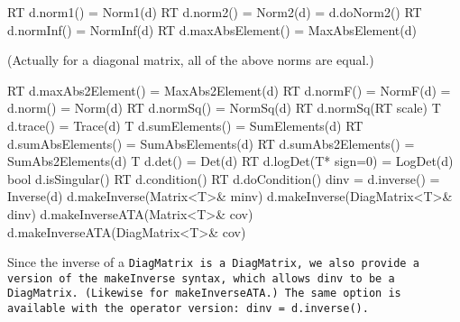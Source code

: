 \begin{tmvcode}
RT d.norm1() = Norm1(d)
RT d.norm2() = Norm2(d) = d.doNorm2()
RT d.normInf() = NormInf(d)
RT d.maxAbsElement() = MaxAbsElement(d)
\end{tmvcode}
(Actually for a diagonal matrix, all of the above norms are equal.)
\begin{tmvcode}
RT d.maxAbs2Element() = MaxAbs2Element(d)
RT d.normF() = NormF(d) = d.norm() = Norm(d)
RT d.normSq() = NormSq(d)
RT d.normSq(RT scale)
T d.trace() = Trace(d)
T d.sumElements() = SumElements(d)
RT d.sumAbsElements() = SumAbsElements(d)
RT d.sumAbs2Elements() = SumAbs2Elements(d)
T d.det() = Det(d)
RT d.logDet(T* sign=0) = LogDet(d)
bool d.isSingular()
RT d.condition()
RT d.doCondition()
dinv = d.inverse() = Inverse(d)
d.makeInverse(Matrix<T>& minv)
d.makeInverse(DiagMatrix<T>& dinv)
d.makeInverseATA(Matrix<T>& cov)
d.makeInverseATA(DiagMatrix<T>& cov)
\end{tmvcode}
Since the inverse of a \tt{DiagMatrix} is a \tt{DiagMatrix},
we also provide a version of the \tt{makeInverse} syntax, which allows dinv
to be a \tt{DiagMatrix}.  (Likewise for \tt{makeInverseATA}.)  The same option is 
available with the operator version: \tt{dinv = d.inverse()}.

